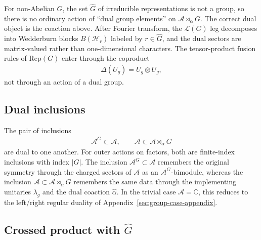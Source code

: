 \documentclass[11pt]{article}
\newcommand{\mA}{\mathcal{A}}
\newcommand{\mH}{\mathcal{H}}
\begin{document}
For non-Abelian $G$, the set $\hat G$ of irreducible representations is not a
group, so there is no ordinary action of ``dual group elements'' on
$\mA\rtimes_\alpha G$. The correct dual object is the coaction above. After
Fourier transform, the $\mathcal L(G)$ leg decomposes into Wedderburn blocks
$B(\mH_r)$ labeled by $r\in\hat G$, and the dual sectors are matrix-valued
rather than one-dimensional characters. The tensor-product fusion rules of
$\mathrm{Rep}(G)$ enter through the coproduct
\begin{align}
    \Delta(U_g)=U_g\otimes U_g,
\end{align}
not through an action of a dual group.

\subsection{Dual inclusions}

The pair of inclusions
\begin{align}
    \mA^G\subset \mA,
    \qquad
    \mA\subset \mA\rtimes_\alpha G
\end{align}
are dual to one another. For outer actions on factors, both are finite-index
inclusions with index $|G|$. The inclusion $\mA^G\subset\mA$ remembers the
original symmetry through the charged sectors of $\mA$ as an $\mA^G$-bimodule,
whereas the inclusion $\mA\subset\mA\rtimes_\alpha G$ remembers the same data
through the implementing unitaries $\lambda_g$ and the dual coaction
$\widehat\alpha$. In the trivial case $\mA=\mathbb C$, this reduces to the
left/right regular duality of Appendix~\ref{sec:group-case-appendix}.

\subsection{Crossed product with $\hat{G}$}
\end{document}
